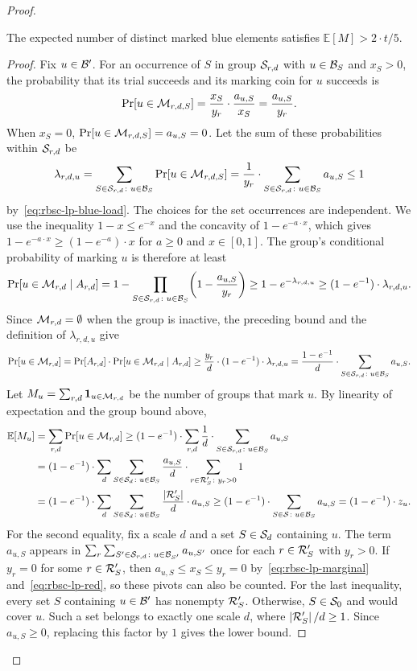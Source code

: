 \begin{proof}
\begin{claim}\label{claim:rbsc-blue-coverage}
The expected number of distinct marked blue elements satisfies $\mathbb{E}[M]>2\cdot t/5$.
\end{claim}
\begin{proof}
Fix $u\in\mathcal{B}'$. For an occurrence of $S$ in group $\mathcal{S}_{r,d}$ with $u\in \mathcal{B}_S$ and $x_S>0$, the probability that its trial succeeds and its marking coin for $u$ succeeds is
\[
 \Pr[u\in \mathcal{M}_{r,d,S}]=\frac{x_S}{y_r}\cdot\frac{a_{u,S}}{x_S}=\frac{a_{u,S}}{y_r}.
\]
When $x_S=0$, $\Pr[u\in \mathcal{M}_{r,d,S}]=a_{u,S}=0$. Let the sum of these probabilities within $\mathcal{S}_{r,d}$ be
\[
 \lambda_{r,d,u}
 =\sum_{S\in\mathcal{S}_{r,d}\colon u\in\mathcal{B}_S}\Pr[u\in\mathcal{M}_{r,d,S}]
 =\frac1{y_r}\cdot\sum_{S\in\mathcal{S}_{r,d}\colon u\in \mathcal{B}_S}a_{u,S}
 \leq1
\]
by~\eqref{eq:rbsc-lp-blue-load}. The choices for the set occurrences are independent. We use the inequality $1-x\leq e^{-x}$ and the concavity of $1-e^{-a\cdot x}$, which gives $1-e^{-a\cdot x}\geq(1-e^{-a})\cdot x$ for $a\geq0$ and $x\in[0,1]$. The group's conditional probability of marking $u$ is therefore at least
\[
 \Pr[u\in\mathcal{M}_{r,d}\mid A_{r,d}]
 =1-\prod_{S\in\mathcal{S}_{r,d}\colon u\in \mathcal{B}_S}
       \mathopen{}\left( 1-\frac{a_{u,S}}{y_r} \right)
 \geq1-e^{-\lambda_{r,d,u}}
 \geq(1-e^{-1})\cdot\lambda_{r,d,u}.
\]
Since $\mathcal{M}_{r,d}=\emptyset$ when the group is inactive, the preceding bound and the definition of $\lambda_{r,d,u}$ give
\[
 \Pr[u\in\mathcal{M}_{r,d}]=\Pr[A_{r,d}]\cdot\Pr[u\in\mathcal{M}_{r,d}\mid A_{r,d}]
 \geq\frac{y_r}{d}\cdot(1-e^{-1})\cdot\lambda_{r,d,u}
 =\frac{1-e^{-1}}{d}\cdot\sum_{S\in\mathcal{S}_{r,d}\colon u\in \mathcal{B}_S}a_{u,S}.
\]
Let $M_u=\sum_{r,d}\boldsymbol{1}_{u\in\mathcal{M}_{r,d}}$ be the number of groups that mark $u$. By linearity of expectation and the group bound above,
\begin{align*}
 \mathbb{E}[M_u]&=\sum_{r,d}\Pr[u\in\mathcal{M}_{r,d}]
 \geq(1-e^{-1})\cdot\sum_{r,d}\frac1d\cdot
       \sum_{S\in\mathcal{S}_{r,d}\colon u\in \mathcal{B}_S}a_{u,S}\\
 &=(1-e^{-1})\cdot\sum_d\sum_{S\in\mathcal{S}_d\colon u\in \mathcal{B}_S}
       \frac{a_{u,S}}d\cdot\sum_{r\in\mathcal{R}'_S\colon y_r>0}1\\
 &=(1-e^{-1})\cdot\sum_d\sum_{S\in\mathcal{S}_d\colon u\in \mathcal{B}_S}
       \frac{\mathopen{}\left| \mathcal{R}'_S \right|}d\cdot a_{u,S}
 \geq(1-e^{-1})\cdot\sum_{S\in\mathcal{S}\colon u\in \mathcal{B}_S}a_{u,S}
 =(1-e^{-1})\cdot z_u.
\end{align*}
For the second equality, fix a scale $d$ and a set $S\in\mathcal{S}_d$ containing $u$. The term $a_{u,S}$ appears in $\sum_r\sum_{S'\in\mathcal{S}_{r,d}\colon u\in\mathcal{B}_{S'}}a_{u,S'}$ once for each $r\in\mathcal{R}'_S$ with $y_r>0$. If $y_r=0$ for some $r\in\mathcal{R}'_S$, then $a_{u,S}\leq x_S\leq y_r=0$ by~\eqref{eq:rbsc-lp-marginal} and~\eqref{eq:rbsc-lp-red}, so these pivots can also be counted. For the last inequality, every set $S$ containing $u\in\mathcal{B}'$ has nonempty $\mathcal{R}'_S$. Otherwise, $S\in\mathcal{S}_0$ and would cover $u$. Such a set belongs to exactly one scale $d$, where $\mathopen{}\left| \mathcal{R}'_S \right|/d\geq1$. Since $a_{u,S}\geq0$, replacing this factor by $1$ gives the lower bound.


\end{proof}
\end{proof}
